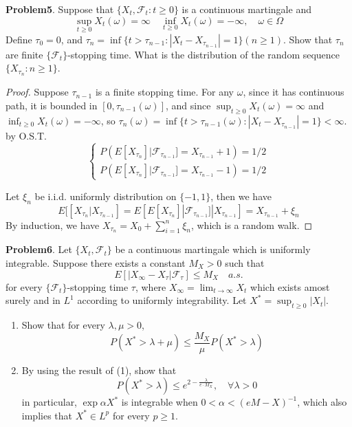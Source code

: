 \documentclass{article}     %
\begin{document}
\noindent 
\textbf{Problem5}. Suppose that $\{X_t,\mathcal{F}_t:t\geq 0\}$ is a continuous martingale and 
\[\sup_{t\geq 0}X_t(\omega)=\infty\quad \inf_{t\geq 0}X_t(\omega)=-\infty, \quad \omega\in \Omega\]
Define $\tau_0=0$, and $\tau_n=\inf\{t>\tau_{n-1}:|X_t-X_{\tau_{n-1}}|=1\}(n\geq 1)$. Show that $\tau_n$ are finite $\{\mathcal{F}_t\}$-stopping time. What is the distribution of the random sequence $\{X_{\tau_n}:n\geq 1\}$.

\begin{proof}
Suppose $\tau_{n-1}$ is a finite stopping time. For any $\omega$, since it has continuous path, it is bounded in $[0,\tau_{n-1}(\omega)]$, and since $\sup_{t\geq 0}X_t(\omega)=\infty$ and  $\inf_{t\geq 0}X_t(\omega)=-\infty$, so $\tau_n(\omega)=\inf\{t>\tau_{n-1}(\omega):|X_t-X_{\tau_{n-1}}|=1\}<\infty$. by O.S.T.
\[\begin{cases}
P\left(E[X_{\tau_n}]|\mathcal{F}_{\tau_{n-1}}]=X_{\tau_{n-1}}+1\right)=1/2\\
P\left( E[X_{\tau_n}]|\mathcal{F}_{\tau_{n-1}}]=X_{\tau_{n-1}}-1\right)=1/2
\end{cases}\]

Let $\xi_n$ be i.i.d. uniformly distribution on $\{-1,1\}$, then we have $$E[[X_{\tau_n}|X_{\tau_{n-1}}]=E[E[X_{\tau_n}]|\mathcal{F}_{\tau_{n-1}}]|X_{\tau_{n-1}}]=X_{\tau_{n-1}}+\xi_n$$
By induction, we have $X_{\tau_n}=X_0+\sum_{i=1}^n \xi_n$, which is a random walk.

\end{proof}


\noindent
\textbf{Problem6}. Let $\{X_t,\mathcal{F}_t\}$ be a continuous martingale which is uniformly integrable. Suppose there exists a constant $M_X>0$ such that 
\[E[|X_{\infty}-X_{\tau}|\mathcal{F}_{\tau}]\leq M_X\quad a.s.\]
for every $\{\mathcal{F}_t\}$-stopping time $\tau$, where $X_{\infty}=\lim_{t\rightarrow \infty} X_t$ which  exists amost surely and in $L^1$ according to uniformly integrability. Let $X^*=\sup_{t\geq 0}|X_t|$.
\begin{enumerate}[(1)]
    \item  Show that  for every $\lambda,\mu>0$,
    \[P(X^*>\lambda+\mu)\leq \frac{M_X}{\mu}P(X^*>\lambda)\]
    \item By using the result of (1), show that 
    \[P(X^*>\lambda)\leq e^{2-\frac{\lambda}{e\cdot M_X}},\quad \forall \lambda>0\]
    in particular, $\exp{\alpha X^*}$ is integrable when $ 0< \alpha<(eM-X)^{-1}$, which also implies that $X^*\in L^p$ for every $p\geq 1$.

\end{enumerate}
\end{document}
